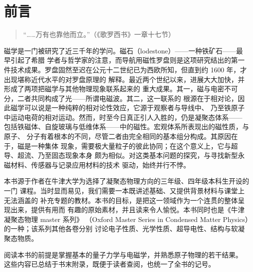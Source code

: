 \chapter*{前言}

\begin{quote}
\centering \kaishu “……万有也靠他而立。”\quad（《歌罗西书》一章十七节）
\end{quote}

磁学是一门被研究了近三千年的学问。磁石（lodestone）——一种铁矿石——最早引起了希腊
学者与哲学家的注意，而导航用磁性罗盘则是这项研究结出的第一件技术成果。罗盘固然至迟在公元十二世纪已为西欧所知，但直到约 1600 年，才出现堪称近代水平的对罗盘原理的
解释。最近两个世纪以来，进展大大加快，并形成了两项把磁学与其他物理现象联系起来的
重大成果。其一，磁与电密不可分，二者共同构成了光——所谓电磁波。其二，这一联系的
根源在于相对论，因此磁学可以说是一种纯粹的相对论性效应，它源于观察者与导线中、
乃至铁原子中运动电荷的相对运动。然而，时至今日真正引人入胜的，仍是凝聚态体系——
包括铁磁体、自旋玻璃与低维体系——中的磁性。宏观体系所表现出的磁性质，与原子、
分子有着根本的不同，尽管二者由完全相同的基本组分构成。其原因在于，磁是一种集体
现象，需要极大量粒子的彼此协同；在这个意义上，它与超导、超流、乃至固态现象本身
颇为相似。对这类基本问题的探究，与寻找新型永磁材料、传感器与记录应用材料的技术
驱动，始终并行不悖。

本书源于作者在牛津大学为选择了凝聚态物理方向的三年级、四年级本科生开设的一门
课程。当时显而易见，我们需要一本既讲述基础、又提供背景材料与课堂上无法涵盖的
补充专题的教材。本书的目标，是把这一领域作为一个连贯的整体呈现出来，提供有用而
有趣的原始素材，并且读来令人愉悦。本书同时也是《牛津凝聚态物理 master 系列》
（Oxford Master Series in Condensed Matter Physics）的一种；该系列其他各卷分别
讨论电子性质、光学性质、超导电性、结构与软凝聚态物质。

阅读本书的前提是掌握基本的量子力学与电磁学，并熟悉原子物理的若干结果。
这些内容已总结于书末附录，既便于读者查阅，也统一了全书的记号。

